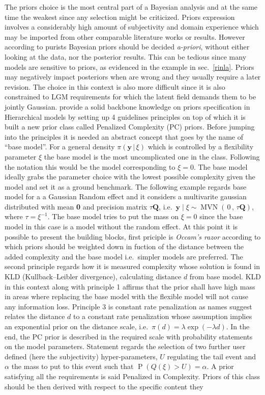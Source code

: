 \documentclass[
  12pt,
  a4paper,
  oneside]{book}
\theoremstyle{definition}
\theoremstyle{definition}
\theoremstyle{definition}
\theoremstyle{remark}
\begin{document}
The priors choice is the most central part of a Bayesian analysis and at the same time the weakest since any selection might be criticized. Priors expression involves a considerably high amount of subjectivity and domain experience which may be imported from other comparable literature works or results. However according to purists Bayesian priors should be decided \emph{a-priori}, without either looking at the data, nor the posterior results. This can be tedious since many models are sensitive to priors, as evidenced in the example in sec.~\ref{rinla}. Priors may negatively impact posteriors when are wrong and they usually require a later revision. The choice in this context is also more difficult since it is also constrained to LGM requirements for which the latent field demands them to be jointly Gaussian. \citet{simpson2017} provide a solid backbone knowledge on priors specification in Hierarchical models by setting up 4 guidelines principles on top of which it is built a new prior class called Penalized Complexity (PC) priors. Before jumping into the principles it is needed an abstract concept that goes by the name of ``base model''. For a general density \(\pi(\mathbf{y} \,| \,\xi)\) which is controlled by a flexibility parameter \(\xi\) the base model is the most uncomplicated one in the class. Following the notation this would be the model corresponding to \(\xi = 0\). The base model ideally grabs the parameter choice with the lowest possible complexity given the model and set it as a ground benchmark. The following example regards base model for a a Gaussian Random effect and it considers a multivarite gaussian distributed with mean \textbf{0} and precision matrix \(\tau \boldsymbol{Q}\), i.e.~\(\mathbf{y} \mid \xi \sim \operatorname{MVN}(\, 0\, ,\,\tau \boldsymbol{Q})\), where \(\tau=\xi^{-1}\). The base model tries to put the mass \citeyearpar{simpson2017} on \(\xi = 0\) since the base model in this case is a model without the random effect. At this point it is possible to present the building blocks, first priciple is \emph{Occam's razor} according to which priors should be weighted down in fuction of the distance between the added complexity and the base model i.e.~simpler models are preferred. The second principle regards how it is measured complexity whose solution is found in KLD (Kullback--Leibler divergence), calculating distance \(d\) from base model. KLD in this context along with principle 1 affirms that the prior shall have high mass in areas where replacing the base model with the flexible model will not cause any information loss. Principle 3 is constant rate penalization as names suggest relates the distance \(d\) to a constant rate penalization whose assumption implies an exponential prior on the distance scale, i.e.~\(\pi(d) = \lambda \exp (-\lambda d)\). In the end, the PC prior is described in the required scale with probability statements on the model parameters. Statement regards the selection of two further user defined (here the subjectivity) hyper-parameters, \(U\) regulating the tail event and \(\alpha\) the mass to put to this event such that \(\operatorname{P}(Q(\xi)>U)=\alpha\). A prior satisfying all the requirements is said Penalized in Complexity. Priors of this class should be then derived with respect to the specific content they 
\end{document}
